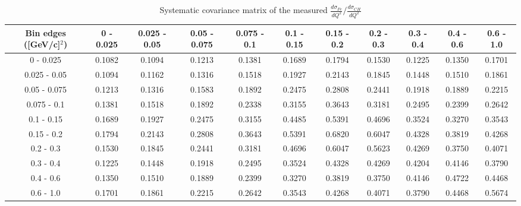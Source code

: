 \documentclass[aps,prl,twocolumn,superscriptaddress,nofootinbib]{revtex4-1}
\begin{document}
\begin{table}[h!]
  \centering
  \caption{Systematic covariance matrix of the measured $\frac{d\sigma_{Fe}}{dQ^{2}}/\frac{d\sigma_{CH}}{dQ^{2}}$}
    \begin{tabular}{c||cccccccccc}
      Bin edges ([GeV/c]$^{2}$) & 0 - 0.025 & 0.025 - 0.05 & 0.05 - 0.075 & 0.075 - 0.1 & 0.1 - 0.15 & 0.15 - 0.2 & 0.2 - 0.3 & 0.3 - 0.4 & 0.4 - 0.6 & 0.6 - 1.0 \\
\hline \hline
         0 - 0.025 &  0.1082 &  0.1094 &  0.1213 &  0.1381 &  0.1689 &  0.1794 &  0.1530 &  0.1225 &  0.1350 &  0.1701 \\
      0.025 - 0.05 &  0.1094 &  0.1162 &  0.1316 &  0.1518 &  0.1927 &  0.2143 &  0.1845 &  0.1448 &  0.1510 &  0.1861 \\
      0.05 - 0.075 &  0.1213 &  0.1316 &  0.1583 &  0.1892 &  0.2475 &  0.2808 &  0.2441 &  0.1918 &  0.1889 &  0.2215 \\
       0.075 - 0.1 &  0.1381 &  0.1518 &  0.1892 &  0.2338 &  0.3155 &  0.3643 &  0.3181 &  0.2495 &  0.2399 &  0.2642 \\
        0.1 - 0.15 &  0.1689 &  0.1927 &  0.2475 &  0.3155 &  0.4485 &  0.5391 &  0.4696 &  0.3524 &  0.3270 &  0.3543 \\
        0.15 - 0.2 &  0.1794 &  0.2143 &  0.2808 &  0.3643 &  0.5391 &  0.6820 &  0.6047 &  0.4328 &  0.3819 &  0.4268 \\
         0.2 - 0.3 &  0.1530 &  0.1845 &  0.2441 &  0.3181 &  0.4696 &  0.6047 &  0.5623 &  0.4269 &  0.3750 &  0.4071 \\
         0.3 - 0.4 &  0.1225 &  0.1448 &  0.1918 &  0.2495 &  0.3524 &  0.4328 &  0.4269 &  0.4204 &  0.4146 &  0.3790 \\
         0.4 - 0.6 &  0.1350 &  0.1510 &  0.1889 &  0.2399 &  0.3270 &  0.3819 &  0.3750 &  0.4146 &  0.4722 &  0.4468 \\
         0.6 - 1.0 &  0.1701 &  0.1861 &  0.2215 &  0.2642 &  0.3543 &  0.4268 &  0.4071 &  0.3790 &  0.4468 &  0.5674 \\
    \end{tabular}
  \label{tablecov:Fe_Systematic_Q2}
\end{table}
\end{document}
